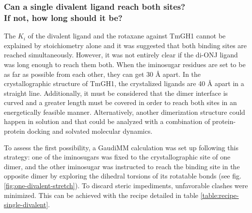 \subsubsection[Can a single divalent ligand reach both sites? If not, how long should it be?]{Can a single divalent ligand reach both sites? \\ If not, how long should it be?}
\label{section:di-ONJ-stretch}

The $K_{i}$ of the divalent ligand and the rotaxane against TmGH1 cannot be explained by stoichiometry alone and it was suggested that both binding sites are reached simultaneously. However, it was not entirely clear if the di-ONJ ligand was long enough to reach them both. When the iminosugar residues are set to be as far as possible from each other, they can get 30 Å apart. In the crystallographic structure of TmGH1,\cite{pdb:2wbg} the crystalized ligands are 40 Å apart in a straight line. Additionally, it must be considered that the dimer interface is curved and a greater length must be covered in order to reach both sites in an energetically feasible manner. Alternatively, another dimerization structure could happen in solution and that could be analyzed with a combination of protein-protein docking and solvated molecular dynamics.

To assess the first possibility, a GaudiMM calculation was set up following this strategy: one of the iminosugars was fixed to the crystallographic site of one dimer, and the other iminosugar was instructed to reach the binding site in the opposite dimer by exploring the dihedral torsions of its rotatable bonds (see fig. \ref{fig:one-divalent-stretch}). To discard steric impediments, unfavorable clashes were minimized. This can be achieved with the recipe detailed in table \ref{table:recipe-single-divalent}.


